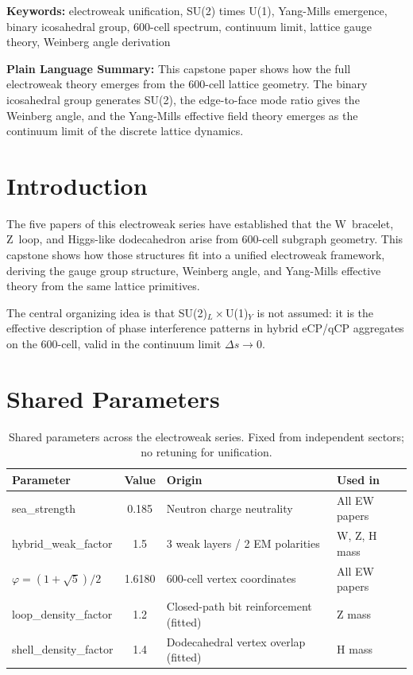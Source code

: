 \documentclass[11pt,letterpaper]{article}
\newcommand{\phig}{\varphi}
\begin{document}
\medskip\noindent
\textbf{Keywords:} electroweak unification, SU(2) times U(1), Yang-Mills emergence, binary icosahedral group, 600-cell spectrum, continuum limit, lattice gauge theory, Weinberg angle derivation

\bigskip\noindent
\textbf{Plain Language Summary:}
This capstone paper shows how the full electroweak theory emerges from the 600-cell lattice geometry. The binary icosahedral group generates SU(2), the edge-to-face mode ratio gives the Weinberg angle, and the Yang-Mills effective field theory emerges as the continuum limit of the discrete lattice dynamics.

\bigskip
\raggedright


\tableofcontents
\newpage

\section{Introduction}

The five papers of this electroweak series have established that the
W~bracelet, Z~loop, and Higgs-like dodecahedron arise from 600-cell
subgraph geometry.  This capstone shows how those structures fit
into a unified electroweak framework, deriving the gauge group
structure, Weinberg angle, and Yang-Mills effective theory from the
same lattice primitives.

The central organizing idea is that SU(2)$_L\times$U(1)$_Y$ is not
assumed: it is the effective description of phase interference patterns
in hybrid eCP/qCP aggregates on the 600-cell, valid in the
continuum limit $\Delta s \to 0$.

\section{Shared Parameters}

\begin{table}[H]
\centering
\caption{Shared parameters across the electroweak series.  Fixed from
  independent sectors; no retuning for unification.}
\label{tab:params}
\begin{tabular}{@{}lcll@{}}
\toprule
Parameter & Value & Origin & Used in \\
\midrule
sea\_strength & 0.185 & Neutron charge neutrality \citep{cpp5014}
  & All EW papers \\
hybrid\_weak\_factor & 1.5 & 3 weak layers / 2 EM polarities
  & W, Z, H mass \\
$\phig = (1+\sqrt5)/2$ & 1.6180 & 600-cell vertex coordinates
  & All EW papers \\
loop\_density\_factor & 1.2 & Closed-path bit reinforcement (fitted)
  & Z mass \\
shell\_density\_factor & 1.4 & Dodecahedral vertex overlap (fitted)
  & H mass \\
\bottomrule
\end{tabular}
\end{table}
\end{document}
